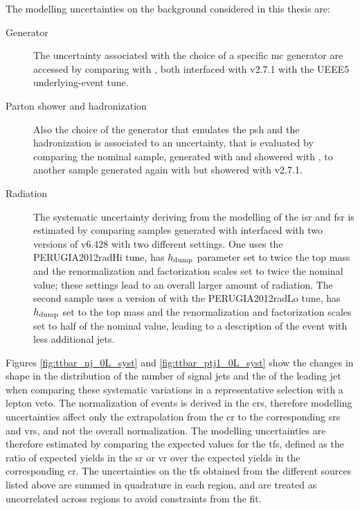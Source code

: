 The modelling uncertainties on the \ttbar background considered in this thesis are:
\begin{description}
\item[Generator] The uncertainty associated with the choice of a specific \gls{mc} generator are accessed by comparing \PowhegBox with \aNLO, both interfaced with \HWpp v2.7.1 with the UEEE5 underlying-event tune.

\item[Parton shower and hadronization] Also the choice of the generator that emulates the \gls{psh} and the hadronization is associated to an uncertainty, that is evaluated by comparing the nominal sample, generated with \PowhegBox and showered with \PY, to another sample generated again with \PowhegBox but showered with \HWpp v2.7.1. 

\item[Radiation] The systematic uncertainty deriving from the modelling of the \gls{isr} and \gls{fsr} is estimated by comparing samples
generated with \PowhegBox interfaced with two versions of \PY v6.428 with two different settings. One uses the PERUGIA2012radHi tune, has $h_{\rm{dump}}$ parameter set to twice the top mass and the renormalization and factorization scales set to twice the nominal value; these settings lead to an overall larger amount of radiation. The second sample uses a version of \PY with the PERUGIA2012radLo tune, has $h_{\rm{dump}}$ set to the top mass and the renormalization and factorization scales set to half of the nominal value, leading to a description of the event with less additional jets.

\end{description}

Figures \ref{fig:ttbar_nj_0L_syst} and \ref{fig:ttbar_ptj1_0L_syst} show the changes in shape in the distribution of the number of signal jets and the \pt of the leading jet when comparing these systematic variations in a representative selection with a lepton veto.
The normalization of \ttbar events is derived in the \glspl{cr}, therefore modelling uncertainties affect only the extrapolation from 
the \gls{cr} to the corresponding \glspl{sr} and \glspl{vr}, and not the overall normalization. 
The modelling uncertainties are therefore estimated by comparing the expected values for the \glspl{tf}, defined as the ratio of expected yields in the \gls{sr} or \gls{vr} over the expected yields in the corresponding \gls{cr}. 
The uncertainties on the \glspl{tf} obtained from the different sources listed above are summed in quadrature in each region, and are treated as uncorrelated across regions to avoid 
constraints from the fit. 


